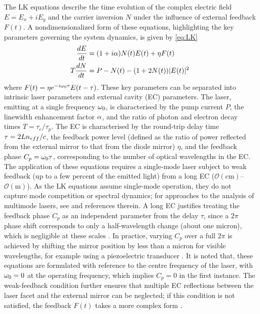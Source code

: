 The LK equations describe the time evolution of the complex electric field $E = E_x + iE_y$ and the carrier inversion $N$ under the influence of external feedback $F(t)$.
A nondimensionalized form of these equations, highlighting the key parameters governing the system dynamics, is given by \eqref{eq:LK} \cite{heil2003delay}
%
\begin{equation}
\label{eq:LK}
    \begin{aligned}
        \frac{d E}{d t} & =(1+i \alpha) N(t) E(t)+\eta F(t) \\
        T \frac{d N}{d t} & =P-N(t)-(1+2 N(t))|E(t)|^2
    \end{aligned}
\end{equation}
%
where $F(t) = \eta e^{-i\omega_0\tau} E(t-\tau)$. 
These key parameters can be separated into intrinsic laser parameters and external cavity (EC) parameters. 
The laser, emitting at a single frequency $\omega_0$, is characterised by the pump current $P$, the linewidth enhancement factor $\alpha$, and the ratio of photon and electron decay times $T = \tau_e/\tau_p$. 
The EC is characterised by the round-trip delay time $\tau = 2Ln_{eff}/c$, the feedback power level (defined as the ratio of power reflected from the external mirror to that from the diode mirror) $\eta$, and the feedback phase $C_p = \omega_0 \tau$, corresponding to the number of optical wavelengths in the EC.
The application of these equations requires a single-mode laser subject to weak feedback (up to a few percent of the emitted light) from a long EC ($\mathcal{O}(\text{cm})$–$\mathcal{O}(\text{m})$). 
As the LK equations assume single-mode operation, they do not capture mode competition or spectral dynamics; for approaches to the analysis of multimode lasers, see \cite{yacomotti2004dynamics} and references therein.
A long EC justifies treating the feedback phase $C_p$ as an independent parameter from the delay $\tau$, since a $2\pi$ phase shift corresponds to only a half-wavelength change (about one micron), which is negligible at these scales \cite{green2006mode}. 
In practice, varying $C_p$ over a full $2\pi$ is achieved by shifting the mirror position by less than a micron for visible wavelengths, for example using a piezoelectric transducer \cite{heil2003delay}.
It is noted that, these equations are formulated with reference to the centre frequency of the laser, with $\omega_0 = 0$ at the operating frequency, which implies $C_p = 0$ in the first instance. 
The weak-feedback condition further ensures that multiple EC reflections between the laser facet and the external mirror can be neglected; if this condition is not satisfied, the feedback $F(t)$ takes a more complex form \cite{vantartwijk1995semiconductor}.
